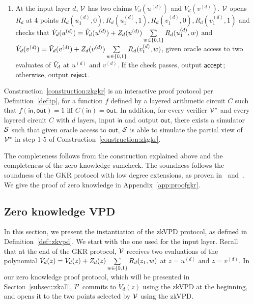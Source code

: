 \begin{mdframed}[nobreak=false]
\begin{construction}
\begin{enumerate}
			\item At the input layer $d$, $\V$ has two claims $\dot{V}_{d}(u^{(d)})$ and $\dot{V}_{d}(v^{(d)})$. $\V$ opens $R_d$ at 4 points $R_d(u_1^{(d)},0),R_d(u_1^{(d)},1),R_d(v_1^{(d)},0),R_d(v_1^{(d)},1)$ and checks that $\dot{V}_{d}(u^{(d)}) = \tV_d(u^{(d)})+Z_d(u^{(d)})\sum\limits_{w \in \binary}R_d(u_1^{(d)},w)$ and $\dot{V}_{d}(v^{(d)}) = \tV_d(v^{(d)})+Z_d(v^{(d)})\sum\limits_{w \in \binary}R_d(v_1^{(d)},w)$, given oracle access to two evaluates of $\tV_d$ at $u^{(d)}$ and $v^{(d)}$. If the check passes, output $\accept$; otherwise, output $\reject$.
			
		\end{enumerate}
	\end{construction}
\end{mdframed}




\begin{theorem}\label{thm:zkgkr}
	Construction~\ref{construction:zkgkr} is an interactive proof protocol per Definition~\ref{def:ip}, for a function $f$ defined by a layered arithmetic circuit $C$ such that $f(\mathsf{in},\mathsf{out}) = 1$ iff $C(\mathsf{in}) = \mathsf{out}$. In addition, for every verifier $\V^*$ and every layered circuit $C$ with $d$ layers, input $\mathsf{in}$ and output $\mathsf{out}$, there exists a simulator $\S$ such that given oracle access to $\mathsf{out}$, $\S$ is able to simulate the partial view of $\V^*$ in step 1-5 of Construction~\ref{construction:zkgkr}. 
\end{theorem}

The completeness follows from the construction explained above and the completeness of the zero knowledge sumcheck. The soundness follows the soundness of the GKR protocol with low degree extensions, as proven in~\cite{GKR} and~\cite{zksumcheck}. We give the proof of zero knowledge in Appendix~\ref{app:proofgkr}.




\subsection{Zero knowledge VPD}\label{subsec::our_zkvpd}
In this section, we present the instantiation of the zkVPD protocol, as defined in Definition~\ref{def::zkvpd}. We start with the one used for the input layer. Recall that at the end of the GKR protocol, $\V$ receives two evaluations of the polynomial $\dot{V}_d(z)=\tV_d(z)+Z_d(z)\sum\limits_{w \in\binary} R_d(z_1,w)$ at $z=u^{(d)}$ and $z=v^{(d)}$. In our zero knowledge proof protocol, which will be presented in Section~\ref{subsec::zkall}, $\P$ commits to $\dot{V}_d(z)$ using the zkVPD at the beginning, and opens it to the two points selected by $\V$ using the zkVPD.




